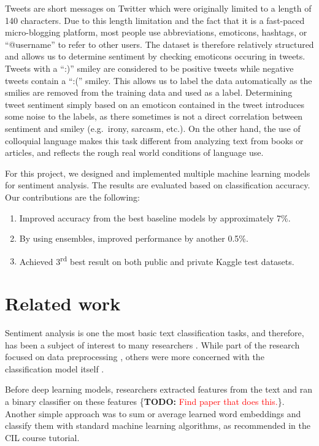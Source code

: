 \documentclass[10pt,conference,compsocconf]{IEEEtran}
\newcommand{\TODO}[1]{\{\textbf{TODO: }\textcolor{red}{#1}\}}
\begin{document}
Tweets are short messages on Twitter which were originally limited to a length of 140 characters. Due to this length limitation and the fact that it is a fast-paced micro-blogging platform, most people use abbreviations, emoticons, hashtags, or ``@username'' to refer to other users. The dataset is therefore relatively structured and allows us to determine sentiment by checking emoticons occuring in tweets. Tweets with a ``:)'' smiley are considered to be positive tweets while negative tweets contain a ``:('' smiley. This allows us to label the data automatically as the smilies are removed from the training data and used as a label. Determining tweet sentiment simply based on an emoticon contained in the tweet introduces some noise to the labels, as there sometimes is not a direct correlation between sentiment and smiley (e.g.~irony, sarcasm, etc.). On the other hand, the use of colloquial language makes this task different from analyzing text from books or articles, and reflects the rough real world conditions of language use. 

For this project, we designed and implemented multiple machine learning models for sentiment analysis. The results are evaluated based on classification accuracy.
Our contributions are the following:
\begin{enumerate}
\item Improved accuracy from the best baseline models by approximately 7\%.
\item By using ensembles, improved performance by another 0.5\%.
\item Achieved 3\textsuperscript{rd} best result on both public and private Kaggle test datasets.
\end{enumerate}

\section{Related work}
Sentiment analysis is one the most basic text classification tasks, and therefore, has been a subject of interest to many researchers \cite{TextCNN,mozetivc2016multilingual,transformer,twitter_preprocessing,CharTextCNN}. While part of the research focused on data preprocessing \cite{twitter_preprocessing}, others were more concerned with the classification model itself \cite{TextCNN}.

Before deep learning models, researchers extracted features from the text and ran a binary classifier on these features \TODO{Find paper that does this.}. Another simple approach was to sum or average learned word embeddings and classify them with standard machine learning algorithms, as recommended in the CIL course tutorial.
\end{document}
